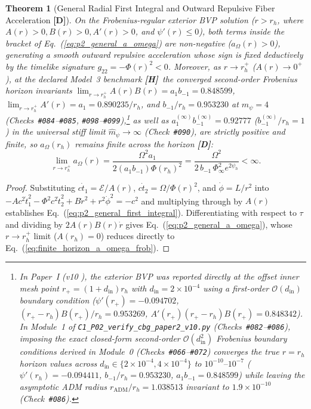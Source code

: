 \documentclass[11pt,a4paper]{article}
\newcommand{\catD}{\textbf{\textcolor{blue!75!black}{[D]}}}
\newcommand{\catH}{\textbf{\textcolor{orange!85!black}{[H]}}}
\theoremstyle{plain}
\newtheorem{theorem}{Theorem}[section]
\theoremstyle{definition}
\theoremstyle{remark}
\numberwithin{equation}{section}
\begin{document}
\begin{theorem}[General Radial First Integral and Outward Repulsive Fiber Acceleration \catD]
On the Frobenius-regular exterior BVP solution ($r > r_h$, where $A(r) > 0, B(r) > 0, A'(r) > 0$, and $\psi'(r) \le 0$), both terms inside the bracket of Eq.~(\ref{eq:p2_general_a_omega}) are non-negative ($a_{\Omega}(r) > 0$), generating a smooth outward repulsive acceleration whose sign is fixed deductively by the timelike signature $g_{22} = -\Phi(r)^2 < 0$. Moreover, as $r \to r_h^+$ ($A(r) \to 0^+$), at the declared Model~3 benchmark \catH\ the converged second-order Frobenius horizon invariants $\lim_{r\to r_h^+} A(r)B(r) = a_1 b_{-1} = 0.848599$, $\lim_{r\to r_h^+} A'(r) = a_1 = 0.890235/r_h$, and $b_{-1}/r_h = 0.953230$ at $\hat{m}_{\psi} = 4$ (Checks~\texttt{\#084}--\texttt{\#085}, \texttt{\#098}--\texttt{\#099}),\footnote{In \textit{Paper~I} (v10 \cite{jimenez2026a}), the exterior BVP was reported directly at the offset inner mesh point $r_+ = (1 + d_{\text{in}})r_h$ with $d_{\text{in}} = 2 \times 10^{-4}$ using a first-order $\mathcal{O}(d_{\text{in}})$ boundary condition ($\psi'(r_+) = -0.094702$, $(r_+ - r_h)B(r_+)/r_h = 0.953269$, $A'(r_+)(r_+ - r_h)B(r_+) = 0.848342$). In Module~1 of \texttt{C1\_P02\_verify\_cbg\_paper2\_v10.py} (Checks~\texttt{\#082}--\texttt{\#086}), imposing the exact closed-form second-order $\mathcal{O}(d_{\text{in}}^2)$ Frobenius boundary conditions derived in Module~0 (Checks~\texttt{\#066}--\texttt{\#072}) converges the true $r = r_h$ horizon values across $d_{\text{in}} \in \{2\times 10^{-4}, 4\times 10^{-4}\}$ to $10^{-10}\text{--}10^{-7}$ ($\psi'(r_h) = -0.094411$, $b_{-1}/r_h = 0.953230$, $a_1 b_{-1} = 0.848599$) while leaving the asymptotic ADM radius $r_{\text{ADM}}/r_h = 1.038513$ invariant to $1.9 \times 10^{-10}$ (Check~\texttt{\#086}).} as well as $a_1^{(\infty)} b_{-1}^{(\infty)} = 0.92777$ ($b_{-1}^{(\infty)}/r_h = 1$) in the universal stiff limit $\hat{m}_{\psi} \to \infty$ (Check~\texttt{\#090}), are strictly positive and finite, so $a_{\Omega}(r_h)$ remains finite across the horizon \catD:
\begin{equation}
  \lim_{r \to r_h^+} a_{\Omega}(r) = \frac{\Omega^2 a_1}{2\left(a_1 b_{-1}\right)\Phi(r_h)^2} = \frac{\Omega^2}{2\,b_{-1}\,\Phi_{\infty}^2 e^{2\psi_h}} < \infty.
  \label{eq:finite_horizon_a_omega_frob}
\end{equation}
\end{theorem}

\begin{proof}
Substituting $c\dot{t}_1 = \mathcal{E}/A(r)$, $c\dot{t}_2 = \Omega/\Phi(r)^2$, and $\dot{\phi} = L/r^2$ into $-A c^2\dot{t}_1^2 - \Phi^2 c^2\dot{t}_2^2 + B\dot{r}^2 + r^2\dot{\phi}^2 = -c^2$ and multiplying through by $A(r)$ establishes Eq.~(\ref{eq:p2_general_first_integral}). Differentiating with respect to $\tau$ and dividing by $2 A(r)B(r)\dot{r}$ gives Eq.~(\ref{eq:p2_general_a_omega}), whose $r \to r_h^+$ limit ($A(r_h) = 0$) reduces directly to Eq.~(\ref{eq:finite_horizon_a_omega_frob}).
\end{proof}
\end{document}
